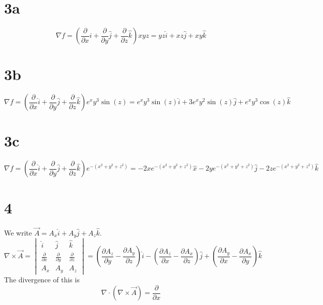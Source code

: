 \documentclass[letterpaper, 11pt]{article}
\begin{document}
\section*{3a}
\[\nabla f = \left(\frac{\partial}{\partial x}\hat{i} + \frac{\partial}{\partial y}\hat{j} + \frac{\partial}{\partial z}\hat{k}\right)xyz=yz\hat{i}+xz\hat{j}+xy\hat{k}\]

\section*{3b}
\[\nabla f = \left(\frac{\partial}{\partial x}\hat{i} + \frac{\partial}{\partial y}\hat{j} + \frac{\partial}{\partial z}\hat{k}\right)e^xy^3\sin(z)=e^xy^3\sin(z)\hat{i}+3e^xy^2\sin(z)\hat{j}+e^xy^3\cos(z)\hat{k}\]

\section*{3c}
\[\nabla f = \left(\frac{\partial}{\partial x}\hat{i} + \frac{\partial}{\partial y}\hat{j} + \frac{\partial}{\partial z}\hat{k}\right)e^{-(x^2+y^2+z^2)}=-2xe^{-(x^2+y^2+z^2)}\hat{x}-2ye^{-(x^2
    +y^2+z^2)}\hat{j}-2ze^{-(x^2+y^2+z^2)}\hat{k}\]

\section*{4}
We write $\vec{A} = A_x\hat{i}+A_y\hat{j}+A_z\hat{k}$. \[\nabla \times \vec{A} = \begin{vmatrix}\hat{i} & \hat{j} & \hat{k} \\ \frac{\partial}{\partial x} & \frac{\partial}{\partial y} & \frac{\partial}{\partial z} \\ A_x & A_y & A_z \end{vmatrix} = \left(\frac{\partial A_z}{\partial y}-\frac{\partial A_y}{\partial z}\right)\hat{i} - \left(\frac{\partial A_z}{\partial x} - \frac{\partial A_x}{\partial z}\right)\hat{j} + \left(\frac{\partial A_y}{\partial x} - \frac{\partial A_x}{\partial y}\right)\hat{k}\]
The divergence of this is \[\nabla \cdot (\nabla \times \vec{A}) = \frac{\partial}{\partial x}\]
\end{document}

